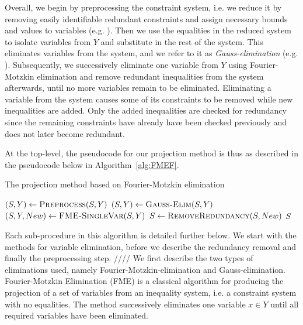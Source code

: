 Overall, we begin by preprocessing the constraint system, i.e. we reduce it by removing easily identifiable redundant constraints and assign necessary bounds and values to variables (e.g. \cite{brearley75,andersen95,maros}).
Then we use the equalities in the reduced system to isolate variables from $Y$ and substitute in the rest of the system. This eliminates variables from the system, and we refer to it as \emph{Gauss-elimination} (e.g. \cite{duffin74,simon05}).  
Subsequently, we successively eliminate one variable from $Y$ using Fourier-Motzkin elimination and remove redundant inequalities from the system afterwards, until no more variables remain to be eliminated. Eliminating a variable from the system causes some of its constraints to be removed while new inequalities are added. Only the added inequalities are checked for redundancy since the remaining constraints have already have been checked previously and does not later become redundant. 

At the top-level, the pseudocode for our projection method is thus as described in the pseudocode below in Algorithm~\ref{alg:FMEF}. 

\begin{algorithm}
\caption{The projection method based on Fourier-Motzkin elimination} 
\label{alg:FMEF}
\begin{algorithmic}
	\State $(S,Y)\gets \Call{Preprocess}{S,Y}$
	\State $(S,Y)\gets\Call{Gauss-Elim}{S,Y}$
		\State $(S, Y, New )\gets\Call{FME-SingleVar}{S,Y}$
		\State $S\gets\Call{RemoveRedundancy}{S,New}$
	\EndWhile
	\State \Return $S$
\EndFunction
\end{algorithmic}
\end{algorithm}

Each sub-procedure in this algorithm is detailed further below. We start with the methods for variable elimination, before we describe the redundancy removal and finally the preprocessing step.
////
We first describe the two types of eliminations used, namely Fourier-Motzkin-elimination and Gauss-elimination. 
Fourier-Motzkin Elimination (FME) is a classical algorithm for producing the projection of a set of variables from an inequality system, i.e. a constraint system with no equalities.
The method successively eliminates one variable $x\in Y$ until all required variables have been eliminated.  

